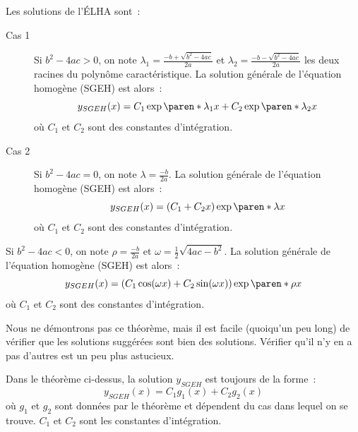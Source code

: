 \begin{frame}
  \begin{theorem}\label{thm:etape-l1-2}
    Les solutions de l'ÉLHA sont~:
    \begin{description}
    \item[Cas 1] Si \(b^{2} -4ac > 0\),\pause{} on note \(\lambda_{1} = \frac{-b + \sqrt{b^{2}-4ac}}{2a}\) et \(\lambda_{2} = \frac{-b - \sqrt{b^{2}-4ac}}{2a}\) les deux racines du polynôme caractéristique.\pause{} La solution générale de l'équation homogène (SGEH) est alors~:\pause{}
      \begin{equation*}
        y_{SGEH}(x) = C_{1} \exp{\paren*{\lambda_{1}x}} + C_{2} \exp{\paren*{\lambda_{2}x}}
      \end{equation*}\pause{}
      où \(C_{1}\) et \(C_{2}\) sont des constantes d'intégration.\pause{}
    \item[Cas 2] Si \(b^{2} -4ac = 0\),\pause{} on note \(\lambda = \frac{-b}{2a}\).\pause{} La solution générale de l'équation homogène (SGEH) est alors~:\pause{}
      \begin{equation*}
        y_{SGEH}(x) = (C_{1} + C_{2}x) \exp{\paren*{\lambda x}}
      \end{equation*}
      où \(C_{1}\) et \(C_{2}\) sont des constantes d'intégration.
    \end{description}
  \end{theorem}
\end{frame}
\begin{frame}
  \begin{theorem}[continué]
    \begin{description}
    \item
    \item[Cas 3] Si \(b^{2} -4ac < 0\),\pause{} on note \(\rho = \frac{-b}{2a}\) et \(\omega = \frac{1}{2}\sqrt{4ac-b^{2}}\).\pause{} La solution générale de l'équation homogène (SGEH) est alors~:\pause{}
      \begin{equation*}
        y_{SGEH}(x) = (C_{1} \cos(\omega x) + C_{2}\sin(\omega x)) \exp{\paren*{\rho x}}
      \end{equation*}
      où \(C_{1}\) et \(C_{2}\) sont des constantes d'intégration.
    \end{description}
  \end{theorem}
\end{frame}

\begin{frame}
  Nous ne démontrons pas ce théorème, mais il est facile (quoiqu'un peu long) de vérifier que les solutions suggérées sont bien des solutions. Vérifier qu'il n'y en a pas d'autres est un peu plus astucieux.

\begin{remark*}
  Dans le théorème ci-dessus, la solution \(y_{SGEH}\) est toujours de la forme~:
  \begin{equation*}
    y_{SGEH}(x) = C_{1} g_{1}(x) + C_{2} g_{2}(x)
  \end{equation*}
  où \(g_{1}\) et \(g_{2}\) sont données par le théorème et dépendent du cas dans lequel on se trouve. \(C_{1}\) et \(C_{2}\) sont les constantes d'intégration.
\end{remark*}
\end{frame}
